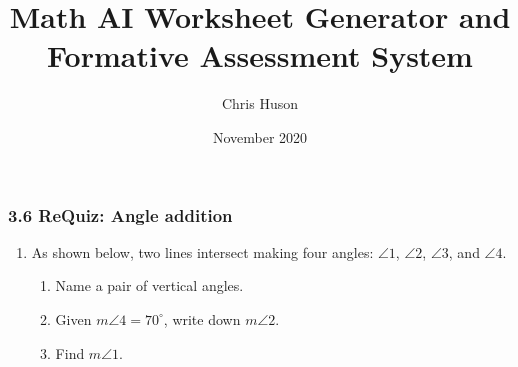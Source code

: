 \documentclass[12pt, twoside]{article}
\title{Math AI Worksheet Generator and Formative Assessment System}
\author{Chris Huson}
\date{November 2020}
\begin{document}
\subsubsection*{3.6 ReQuiz: Angle addition}
\begin{enumerate}
\item As shown below, two lines intersect making four angles: $\angle 1$, $\angle 2$, $\angle 3$, and $\angle 4$.
  \begin{multicols}{2}  
    \begin{enumerate}
      \item Name a pair of vertical angles. \vspace{1.5cm}
      \item Given $m\angle 4 = 70^\circ$, write down $m\angle 2$. \vspace{1.5cm}
      \item Find $m\angle 1$. \vspace{2cm}
    \end{enumerate}
  \end{multicols}


\end{enumerate}
\end{document}
